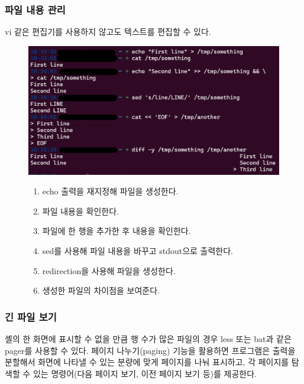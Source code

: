 \subsubsection*{파일 내용 관리}
\begin{flushleft}
    vi 같은 편집기를 사용하지 않고도 텍스트를 편집할 수 있다.
\end{flushleft}

\begin{figure}[H]
    \includegraphics[width=15cm]{resource/3-file-management}
    \label{fig:file-manament}
    \begin{enumerate}
        \item echo 출력을 재지정해 파일을 생성한다.
        \item 파일 내용을 확인한다.
        \item 파일에 한 행을 추가한 후 내용을 확인한다.
        \item sed를 사용해 파일 내용을 바꾸고 stdout으로 출력한다.
        \item redirection을 사용해 파일을 생성한다.
        \item 생성한 파일의 차이점을 보여준다.
    \end{enumerate}
\end{figure}


\subsubsection*{긴 파일 보기}
\begin{flushleft}
    셸의 한 화면에 표시할 수 없을 만큼 행 수가 많은 파일의 경우
    less 또는 bat과 같은 pager를 사용할 수 있다.
    페이지 나누기(paging) 기능을 활용하면 프로그램은 출력을 분할해서
    화면에 나타낼 수 있는 분량에 맞게 페이지를 나눠 표시하고,
    각 페이지를 탐색할 수 있는 명령어(다음 페이지 보기, 이전 페이지 보기 등)를 제공한다.
\end{flushleft}


